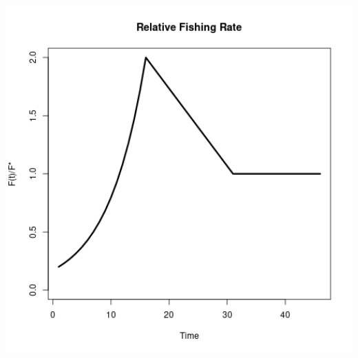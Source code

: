 \documentclass[ xcolor = pdftex, dvipsnames, table ]{beamer}
\begin{document}
%
\begin{frame}
\begin{minipage}[h!]{0.325\textwidth}
\hspace*{-0.75cm}
\includegraphics[width=1.1\textwidth]{../../.././nick/gpBias/rfExpT45X2Z0.6.png}\\

\end{minipage}
\end{frame}
\end{document}

